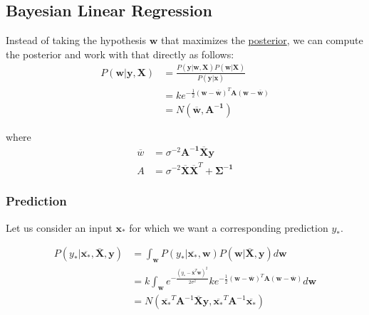 \documentclass[12pt]{article}
\begin{document}
    \subsection{Bayesian Linear Regression}
        Instead of taking the hypothesis $\boldsymbol{w}$ that maximizes the \hyperref[fact:Posterior]{posterior}, we
        can compute the posterior and work with that directly as follows:
        \begin{align*}
            P(\boldsymbol{w}|\boldsymbol{y}, \boldsymbol{X}) &= \frac{P(\boldsymbol{y}|\boldsymbol{w}, \boldsymbol{X})P(\boldsymbol{w}|\boldsymbol{X})}{P(\boldsymbol{y}|\boldsymbol{x})} \\
            &= ke^{-\frac{1}{2}(\boldsymbol{w}-\overline{\boldsymbol{w}})^T\boldsymbol{A}(\boldsymbol{w}-\overline{\boldsymbol{w}})} \\
            &= N(\overline{\boldsymbol{w}}, \boldsymbol{A^{-1}})
        \end{align*}

        where
        \begin{align*}
        \overline{w} &= \sigma^{-2}\boldsymbol{A^{-1}}\overline{\boldsymbol{X}}\boldsymbol{y} \\
        A &= \sigma^{-2}\boldsymbol{\overline{X}\overline{X}}^T + \boldsymbol{\Sigma^{-1}}
        \end{align*}

        \subsubsection{Prediction}
            Let us consider an input $\boldsymbol{x_*}$ for which we want a corresponding prediction $y_*$.

            \begin{align*}
                P(y_*|\overline{\boldsymbol{x_*}}, \overline{\boldsymbol{X}}, \boldsymbol{y}) &= \int_{\boldsymbol{w}} P(y_*|\overline{\boldsymbol{x_*}},\boldsymbol{w})P(\boldsymbol{w}|\overline{\boldsymbol{X}},\boldsymbol{y})d\boldsymbol{w} \\
                &= k \int_{\boldsymbol{w}} e^{-\frac{(y_* - \overline{\boldsymbol{x}}^T\boldsymbol{w})^2}{2\sigma^2}} ke^{-\frac{1}{2}(\boldsymbol{w}-\overline{\boldsymbol{w}})^T\boldsymbol{A}(\boldsymbol{w}-\overline{\boldsymbol{w}})}d\boldsymbol{w} \\
                &= N(\overline{\boldsymbol{x_*}}^T \boldsymbol{A}^{-1}\overline{\boldsymbol{X}}\boldsymbol{y}, \overline{\boldsymbol{x_*}}^T \boldsymbol{A}^{-1} \overline{\boldsymbol{x_*}})
            \end{align*}
\end{document}
